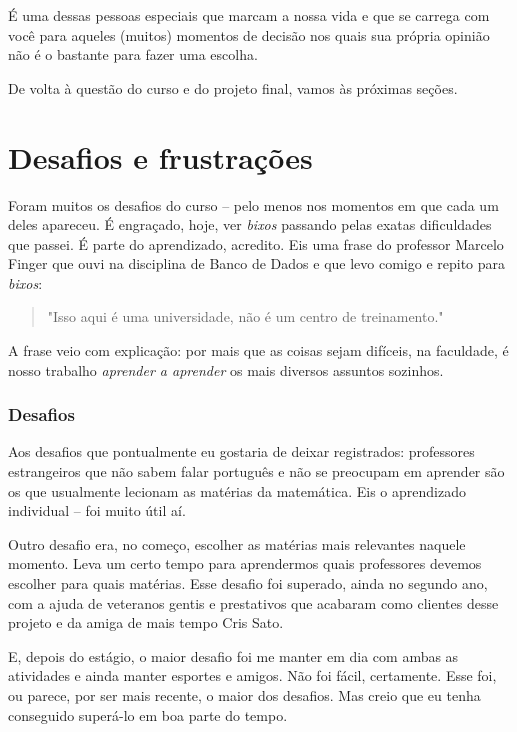 \documentclass[titlepage,a4paper]{article}
\begin{document}
É uma dessas pessoas especiais que marcam a nossa vida e que se carrega com você para aqueles (muitos) momentos de decisão nos quais sua própria opinião não é o bastante para fazer uma escolha.

De volta à questão do curso e do projeto final, vamos às próximas seções.

\section{Desafios e frustrações}

Foram muitos os desafios do curso -- pelo menos nos momentos em que cada um deles apareceu. É engraçado, hoje, ver \textit{bixos} passando pelas exatas dificuldades que passei. É parte do aprendizado, acredito. Eis uma frase do professor Marcelo Finger que ouvi na disciplina de Banco de Dados e que levo comigo e repito para \textit{bixos}:

\begin{quote}
	"Isso aqui é uma universidade, não é um centro de treinamento."
\end{quote}

A frase veio com explicação: por mais que as coisas sejam difíceis, na faculdade, é nosso trabalho \textit{aprender a aprender} os mais diversos assuntos sozinhos.

\subsubsection*{Desafios}

Aos desafios que pontualmente eu gostaria de deixar registrados: professores estrangeiros que não sabem falar português e não se preocupam em aprender são os que usualmente lecionam as matérias da matemática. Eis o aprendizado individual -- foi muito útil aí.

Outro desafio era, no começo, escolher as matérias mais relevantes naquele momento. Leva um certo tempo para aprendermos quais professores devemos escolher para quais matérias. Esse desafio foi superado, ainda no segundo ano, com a ajuda de veteranos gentis e prestativos que acabaram como clientes desse projeto e da amiga de mais tempo Cris Sato.

E, depois do estágio, o maior desafio foi me manter em dia com ambas as atividades e ainda manter esportes e amigos. Não foi fácil, certamente. Esse foi, ou parece, por ser mais recente, o maior dos desafios. Mas creio que eu tenha conseguido superá-lo em boa parte do tempo.
\end{document}
